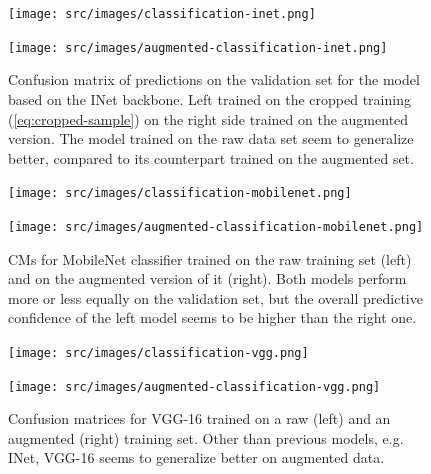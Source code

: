 \begin{figure}
    \centering
    \begin{multicols}{2}
        \begin{minipage}{.45\textwidth}
            \texttt{[image: src/images/classification-inet.png]}
        \end{minipage}
        \columnbreak
        \begin{minipage}{.45\textwidth}
            \texttt{[image: src/images/augmented-classification-inet.png]}
        \end{minipage}
    \end{multicols}
    \caption{Confusion matrix of predictions on the validation set for the model based on the INet backbone. Left trained on the cropped training (\eqref{eq:cropped-sample}) on the right side trained on the augmented version.
    The model trained on the raw data set seem to generalize better, compared to its counterpart trained on the augmented set.}
    \label{fig:classification-inet-conf}
\end{figure}
\begin{figure}
    \centering
    \begin{multicols}{2}
        \begin{minipage}{.45\textwidth}
            \texttt{[image: src/images/classification-mobilenet.png]}
        \end{minipage}
        \columnbreak
        \begin{minipage}{.45\textwidth}
            \texttt{[image: src/images/augmented-classification-mobilenet.png]}
        \end{minipage}
    \end{multicols}
    \caption{CMs for MobileNet classifier trained on the raw training set (left) and on the augmented version of it (right).
    Both models perform more or less equally on the validation set, but the overall predictive confidence of the left model seems to be higher than the right one.}
    \label{fig:classification-mobilenet-conf}
\end{figure}
\begin{figure}
    \centering
    \begin{multicols}{2}
        \begin{minipage}{.45\textwidth}
            \texttt{[image: src/images/classification-vgg.png]}
        \end{minipage}
        \columnbreak
        \begin{minipage}{.45\textwidth}
            \texttt{[image: src/images/augmented-classification-vgg.png]}
        \end{minipage}
    \end{multicols}
    \caption{Confusion matrices for VGG-16 trained on a raw (left) and an augmented (right) training set. Other than previous models, e.g. INet, VGG-16 seems to generalize better on augmented data.}
    \label{fig:classification-vgg-conf}
\end{figure}

